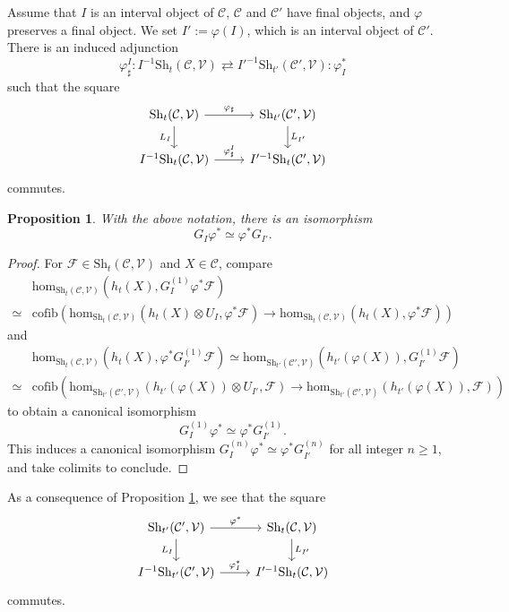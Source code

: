 \documentclass[10pt]{amsart}
\newtheorem{prop}[thm]{Proposition}
\theoremstyle{definition}
\theoremstyle{remark}
\numberwithin{equation}{subsection}
\newcommand{\cC}{\mathcal{C}}
\newcommand{\cF}{\mathcal{F}}
\newcommand{\cV}{\mathcal{V}}
\newcommand{\map}{\mathrm{hom}}
\newcommand{\cofib}{\mathrm{cofib}}
\newcommand{\infShv}{\mathrm{Sh}}
\begin{document}
Assume that $I$ is an interval object of $\cC$, $\cC$ and $\cC'$ have final objects, and $\varphi$ preserves a final object.
We set $I':=\varphi(I)$, which is an interval object of $\cC'$.
There is an induced adjunction
\begin{equation}
\varphi_\sharp^I : I^{-1}\infShv_t(\cC,\cV)\rightleftarrows I'^{-1}\infShv_{t'}(\cC',\cV) : \varphi_I^*
\end{equation}
such that the square
\begin{equation}
\begin{tikzcd}
\infShv_t(\cC,\cV)\ar[d,"L_I"']\ar[r,"\varphi_\sharp"]&
\infShv_{t'}(\cC',\cV)\ar[d,"L_{I'}"]
\\
I^{-1}\infShv_t(\cC,\cV)\ar[r,"\varphi_\sharp^I"]&
I'^{-1}\infShv_t(\cC',\cV)
\end{tikzcd}
\end{equation}
commutes.

\begin{prop}
\label{divlocal.9}
With the above notation, 
there is an isomorphism
\[
G_I\varphi^*
\simeq
\varphi^* G_{I'}.
\]
\end{prop}
\begin{proof}
For $\cF\in \infShv_t(\cC,\cV)$ and $X\in \cC$, compare
\begin{align*}
& \map_{\infShv_t(\cC,\cV)}(h_t(X),G_I^{(1)}\varphi^*\cF)
\\
\simeq &
\cofib(
\map_{\infShv_t(\cC,\cV)}(h_t(X)\otimes U_I,\varphi^*\cF)
\to
\map_{\infShv_t(\cC,\cV)}(h_t(X),\varphi^*\cF))
\end{align*}
and
\begin{align*}
& \map_{\infShv_t(\cC,\cV)}(h_t(X),\varphi^*G_{I'}^{(1)}\cF)
\simeq 
\map_{\infShv_{t'}(\cC',\cV)}(h_{t'}(\varphi(X)),G_{I'}^{(1)}\cF)
\\
\simeq &
\cofib(
\map_{\infShv_{t'}(\cC',\cV)}(h_{t'}(\varphi(X))\otimes U_{I'},\cF)
\to
\map_{\infShv_{t'}(\cC',\cV)}(h_{t'}(\varphi(X)),\cF))
\end{align*}
to obtain a canonical isomorphism
\[
G_I^{(1)}\varphi^*
\simeq
\varphi^* G_{I'}^{(1)}.
\]
This induces a canonical isomorphism $G_I^{(n)}\varphi^* \simeq \varphi^* G_{I'}^{(n)}$ for all integer $n\geq 1$, and take colimits to conclude.
\end{proof}

As a consequence of Proposition \ref{divlocal.9}, we see that the square
\begin{equation}
\label{divlocal.9.1}
\begin{tikzcd}
\infShv_{t'}(\cC',\cV)\ar[d,"L_I"']\ar[r,"\varphi^*"]&
\infShv_{t}(\cC,\cV)\ar[d,"L_{I'}"]
\\
I^{-1}\infShv_{t'}(\cC',\cV)\ar[r,"\varphi_I^*"]&
I'^{-1}\infShv_t(\cC,\cV)
\end{tikzcd}
\end{equation}
commutes.
\end{document}
